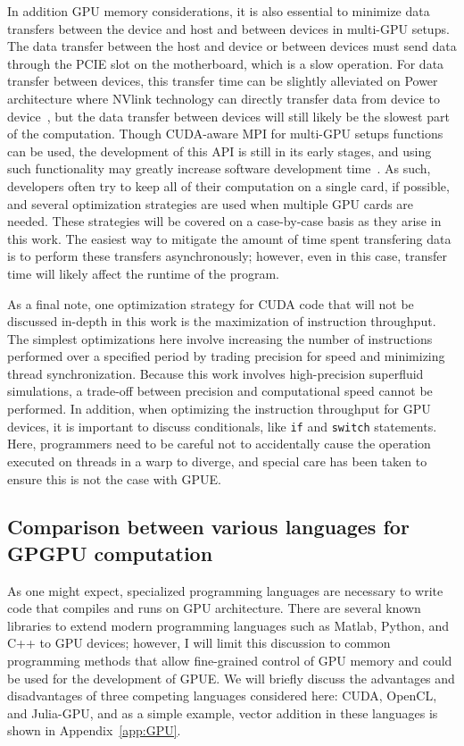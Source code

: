 In addition GPU memory considerations, it is also essential to minimize data transfers between the device and host and between devices in multi-GPU setups.
The data transfer between the host and device or between devices must send data through the PCIE slot on the motherboard, which is a slow operation.
For data transfer between devices, this transfer time can be slightly alleviated on Power architecture where NVlink technology can directly transfer data from device to device~\cite{foley2017}, but the data transfer between devices will still likely be the slowest part of the computation.
Though CUDA-aware MPI for multi-GPU setups functions can be used, the development of this API is still in its early stages, and using such functionality may greatly increase software development time~\cite{lonvcar2016, wang2013}.
As such, developers often try to keep all of their computation on a single card, if possible, and several optimization strategies are used when multiple GPU cards are needed.
These strategies will be covered on a case-by-case basis as they arise in this work.
The easiest way to mitigate the amount of time spent transfering data is to perform these transfers asynchronously; however, even in this case, transfer time will likely affect the runtime of the program.

As a final note, one optimization strategy for CUDA code that will not be discussed in-depth in this work is the maximization of instruction throughput.
The simplest optimizations here involve increasing the number of instructions performed over a specified period by trading precision for speed and minimizing thread synchronization.
Because this work involves high-precision superfluid simulations, a trade-off between precision and computational speed cannot be performed.
In addition, when optimizing the instruction throughput for GPU devices, it is important to discuss conditionals, like \texttt{if} and \texttt{switch} statements.
Here, programmers need to be careful not to accidentally cause the operation executed on threads in a warp to diverge, and special care has been taken to ensure this is not the case with GPUE.


\subsection{Comparison between various languages for GPGPU computation}
\label{sec:compare}

As one might expect, specialized programming languages are necessary to write code that compiles and runs on GPU architecture.
There are several known libraries to extend modern programming languages such as Matlab, Python, and C++ to GPU devices; however, I will limit this discussion to common programming methods that allow fine-grained control of GPU memory and could be used for the development of GPUE.
We will briefly discuss the advantages and disadvantages of three competing languages considered here: CUDA, OpenCL, and Julia-GPU, and as a simple example, vector addition in these languages is shown in  Appendix~\ref{app:GPU}.

